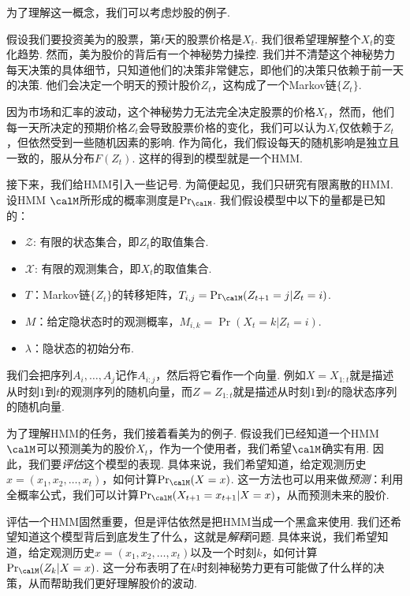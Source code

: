 为了理解这一概念，我们可以考虑炒股的例子. 
\begin{example}[美为HMM]\label{ex:meiwei-HMM}
假设我们要投资美为的股票，第$t$天的股票价格是$X_t$. 我们很希望理解整个$X_t$的变化趋势. 然而，美为股价的背后有一个神秘势力操控. 我们并不清楚这个神秘势力每天决策的具体细节，只知道他们的决策非常健忘，即他们的决策只依赖于前一天的决策. 他们会决定一个明天的预计股价$Z_t$，这构成了一个Markov链$\{Z_t\}$. 

因为市场和汇率的波动，这个神秘势力无法完全决定股票的价格$X_t$，然而，他们每一天所决定的预期价格$Z_t$会导致股票价格的变化，我们可以认为$X_t$仅依赖于$Z_t$，但依然受到一些随机因素的影响. 作为简化，我们假设每天的随机影响是独立且一致的，服从分布$F(Z_t)$. 这样的得到的模型就是一个HMM.
\end{example}

接下来，我们给HMM引入一些记号. 为简便起见，我们只研究有限离散的HMM. 设HMM $\calM$所形成的概率测度是$\Pr_\calM$. 我们假设模型中以下的量都是已知的：
\begin{itemize}
    \item $\mathcal Z$: 有限的状态集合，即$Z_t$的取值集合.
    \item $\mathcal X$: 有限的观测集合，即$X_t$的取值集合.
    \item $T$：Markov链$\{Z_t\}$的转移矩阵，$T_{i,j}=\Pr_\calM(Z_{t+1}=j|Z_t=i)$.
    \item $M$：给定隐状态时的观测概率，$M_{i,k} = \Pr(X_t=k|Z_t=i)$.
    \item $\lambda$：隐状态的初始分布.
\end{itemize}

我们会把序列$A_i,\dots, A_j$记作$A_{i:j}$，然后将它看作一个向量. 例如$X=X_{1:t}$就是描述从时刻$1$到$t$的观测序列的随机向量，而$Z=Z_{1:t}$就是描述从时刻$1$到$t$的隐状态序列的随机向量.

为了理解HMM的任务，我们接着看美为的例子. 假设我们已经知道一个HMM $\calM$可以预测美为的股价$X_t$，作为一个使用者，我们希望$\calM$确实有用. 因此，我们要\emph{评估}这个模型的表现. 具体来说，我们希望知道，给定观测历史$x=(x_1,x_2,\dots,x_t)$，如何计算$\Pr_\calM(X=x)$. 这一方法也可以用来做\emph{预测}：利用全概率公式，我们可以计算$\Pr_\calM(X_{t+1}=x_{t+1}|X=x)$，从而预测未来的股价.

评估一个HMM固然重要，但是评估依然是把HMM当成一个黑盒来使用. 我们还希望知道这个模型背后到底发生了什么，这就是\emph{解释}问题. 具体来说，我们希望知道，给定观测历史$x=(x_1,x_2,\dots,x_t)$以及一个时刻$k$，如何计算$\Pr_\calM(Z_k|X=x)$. 这一分布表明了在$k$时刻神秘势力更有可能做了什么样的决策，从而帮助我们更好理解股价的波动.

